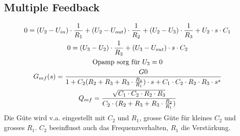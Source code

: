 \subsection{Multiple Feedback}
\begin{figure}[!h]
	\begin{center}
		 \qquad
	\end{center} 
\end{figure}
\begin{gather*}
0=(U_2-U_{in})\cdot \frac{1}{R_1}+(U_2-U_{out})\cdot \frac{1}{R_2}+(U_2-U_3)\cdot \frac{1}{R_3}+U_2\cdot s\cdot C_1\\
0=(U_3-U_2)\cdot \frac{1}{R_3}+(U_3-U_{out})\cdot s\cdot C_2\\
\text{Opamp sorg für }U_3=0\notag\\
G_{mf}(s)=\frac{G0}{1+C_2(R_2+R_3+R_3\cdot \frac{R_2}{R_1})\cdot s+C_1\cdot C_2\cdot R_2\cdot R_3\cdot s^s}\\
Q_{mf}=\frac{\sqrt{C_1\cdot C_2\cdot R_2\cdot R_3}}{C_2\cdot (R_2+R_3+R_3\cdot \frac{R_2}{R_1})}
\end{gather*}
Die Güte wird v.a. eingestellt mit $C_2$ und $R_1$, grosse Güte für kleines
$C_2$ und grosses $R_1$. $C_2$ beeinflusst auch das Frequenzverhalten, $R_1$ die
Verstärkung.

